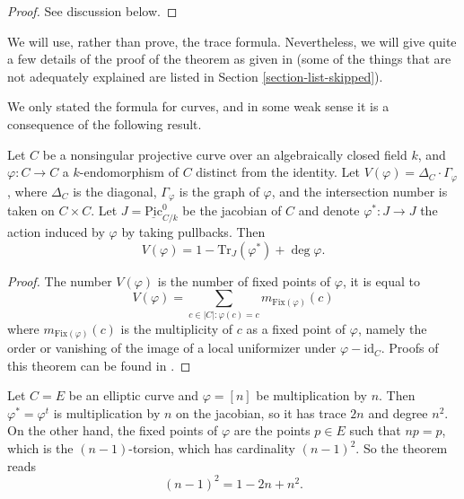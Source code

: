 \begin{proof}
See discussion below.
\end{proof}

\noindent
We will use, rather than prove, the trace formula. Nevertheless, we will
give quite a few details of the proof of the theorem as given in
\cite{SGA4.5} (some of the things that are not adequately explained
are listed in Section \ref{section-list-skipped}).

\medskip\noindent
We only stated the formula for curves, and in some weak
sense it is a consequence of the following result.

\begin{theorem}[Weil]
\label{theorem-weil-trace-formula}
Let $C$ be a nonsingular projective curve over an algebraically closed field
$k$, and $\varphi : C \to C$ a $k$-endomorphism of $C$ distinct from the
identity. Let $V(\varphi) = \Delta_C \cdot \Gamma_\varphi$, where $\Delta_C$ is
the diagonal, $\Gamma_\varphi$ is the graph of $\varphi$, and the intersection
number is taken on $C \times C$. Let $J = \underline{\text{Pic}}^0_{C/k}$ be the
jacobian of $C$ and denote $\varphi^* : J \to J$ the action induced by
$\varphi$ by taking pullbacks. Then
$$
V(\varphi) = 1 - \text{Tr}_J(\varphi^*) + \deg \varphi.
$$
\end{theorem}

\begin{proof}
The number $V(\varphi)$ is the number of fixed points of $\varphi$, it is equal
to
$$
V(\varphi) = \sum_{c \in |C| : \varphi(c) = c} m_\text{Fix$(\varphi)$} (c)
$$
where $m_\text{Fix$(\varphi)$} (c)$ is the multiplicity of $c$ as a fixed point
of $\varphi$, namely the order or vanishing of the image of a local uniformizer
under $\varphi - \text{id}_C$. Proofs of this theorem can be found in
\cite{Lang, Weil}.
\end{proof}

\begin{example}
\label{example-elliptic-curve}
Let $C = E$ be an elliptic curve and $\varphi = [n]$ be multiplication by $n$.
Then $\varphi^* = \varphi^t$ is multiplication by $n$ on the jacobian, so it
has trace $2n$ and degree $n^2$. On the other hand, the fixed points of
$\varphi$ are the points $p \in E$ such that $n p = p$, which is the
$(n-1)$-torsion, which has cardinality $(n-1)^2$. So the theorem reads
$$
(n-1)^2 = 1 - 2n + n^2.
$$
\end{example}

